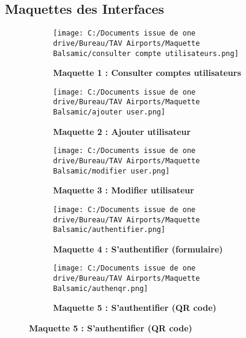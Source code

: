\documentclass[a4paper,11pt]{report}
\begin{document}
\subsection{Maquettes des Interfaces}

\begin{figure}[H]
  \centering
  \begin{subfigure}[b]{0.8\textwidth}
    \texttt{[image: C:/Documents issue de one drive/Bureau/TAV Airports/Maquette Balsamic/consulter compte utilisateurs.png]}
    \caption{\textbf{Maquette 1 : Consulter comptes utilisateurs}}
    \label{fig:maquette1}
  \end{subfigure}

  \vspace{0.8cm}

  \begin{subfigure}[b]{0.8\textwidth}
    \texttt{[image: C:/Documents issue de one drive/Bureau/TAV Airports/Maquette Balsamic/ajouter user.png]}
    \caption{\textbf{Maquette 2 : Ajouter utilisateur}}
    \label{fig:maquette2}
  \end{subfigure}

  \vspace{0.8cm}
\newpage
  \begin{subfigure}[b]{0.8\textwidth}
    \texttt{[image: C:/Documents issue de one drive/Bureau/TAV Airports/Maquette Balsamic/modifier user.png]}
    \caption{\textbf{Maquette 3 : Modifier utilisateur}}
    \label{fig:maquette3}
  \end{subfigure}

  \vspace{0.8cm}

  \begin{subfigure}[b]{0.8\textwidth}
    \texttt{[image: C:/Documents issue de one drive/Bureau/TAV Airports/Maquette Balsamic/authentifier.png]}
    \caption{\textbf{Maquette 4 : S’authentifier (formulaire)}}
    \label{fig:maquette4form}
  \end{subfigure}

  \vspace{0.8cm}

  \begin{subfigure}[b]{0.8\textwidth}
    \texttt{[image: C:/Documents issue de one drive/Bureau/TAV Airports/Maquette Balsamic/authenqr.png]}
    \caption{\textbf{Maquette 5 : S’authentifier (QR code)}}
    \label{fig:maquette4qr}
  \end{subfigure}


\end{figure}
\end{document}
